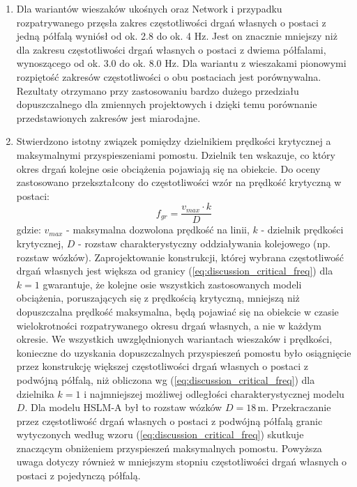 \begin{enumerate}
\item Dla wariantów wieszaków ukośnych oraz Network i przypadku rozpatrywanego przęsła zakres częstotliwości drgań własnych o postaci z jedną półfalą wyniósł od ok. 2.8 do ok. 4 Hz. Jest on znacznie mniejszy niż dla zakresu częstotliwości drgań własnych o postaci z dwiema półfalami, wynoszącego od ok. 3.0 do ok. 8.0 Hz. Dla wariantu z wieszakami pionowymi rozpiętość zakresów częstotliwości o obu postaciach jest porównywalna. Rezultaty otrzymano przy zastosowaniu bardzo dużego przedziału dopuszczalnego dla zmiennych projektowych i dzięki temu porównanie przedstawionych zakresów jest miarodajne.

\item Stwierdzono istotny związek pomiędzy dzielnikiem prędkości krytycznej a maksymalnymi przyspieszeniami pomostu. Dzielnik ten wskazuje, co który okres drgań kolejne osie obciążenia pojawiają się na obiekcie. Do oceny zastosowano przekształcony do częstotliwości wzór na prędkość krytyczną w postaci:
\begin{equation} \label{eq:discussion_critical_freq}
	f_{gr} = \frac{v_{max}\cdot k}{D} 
\end{equation}
gdzie: $v_{max}$ - maksymalna dozwolona prędkość na linii, $k$ - dzielnik prędkości krytycznej, $D$ - rozstaw charakterystyczny oddziaływania kolejowego (np. rozstaw wózków). Zaprojektowanie konstrukcji, której wybrana częstotliwość drgań własnych jest większa od granicy (\ref{eq:discussion_critical_freq}) dla $k=1$ gwarantuje, że kolejne osie wszystkich zastosowanych modeli obciążenia, poruszających się z prędkością krytyczną, mniejszą niż dopuszczalna prędkość maksymalna, będą pojawiać się na obiekcie w czasie wielokrotności rozpatrywanego okresu drgań własnych, a nie w każdym okresie. We wszystkich uwzględnionych wariantach wieszaków i prędkości, konieczne do uzyskania dopuszczalnych przyspieszeń pomostu było osiągnięcie przez konstrukcję większej częstotliwości drgań własnych o postaci z podwójną półfalą, niż obliczona wg (\ref{eq:discussion_critical_freq}) dla dzielnika $k=1$ i najmniejszej możliwej odległości charakterystycznej modelu $D$. Dla modelu HSLM-A był to rozstaw wózków $D=18\,\mathrm{m}$. Przekraczanie przez częstotliwość drgań własnych o postaci z podwójną półfalą granic wytyczonych według wzoru (\ref{eq:discussion_critical_freq}) skutkuje znaczącym obniżeniem przyspieszeń maksymalnych pomostu. Powyższa uwaga dotyczy również w mniejszym stopniu częstotliwości drgań własnych o postaci z pojedynczą półfalą. 

\end{enumerate}

